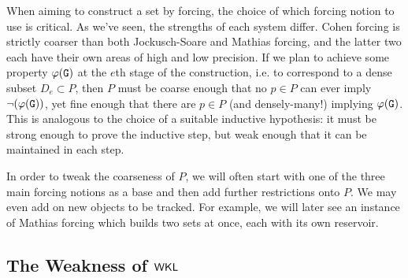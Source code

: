 \documentclass{amsart}
\begin{document}
	
	When aiming to construct a set by forcing, the choice of which forcing notion to use is critical. As we've seen, the strengths of each system differ. Cohen forcing is strictly coarser than both Jockusch-Soare and Mathias forcing, and the latter two each have their own areas of high and low precision. If we plan to achieve some property $\varphi(\mathtt{G})$ at the $e$th stage of the construction, i.e. to correspond to a dense subset $D_e\subset P$, then $P$ must be coarse enough that no $p\in P$ can ever imply $\neg(\varphi(\mathtt{G}))$, yet fine enough that there are $p\in P$ (and densely-many!) implying $\varphi(\mathtt{G})$. This is analogous to the choice of a suitable inductive hypothesis: it must be strong enough to prove the inductive step, but weak enough that it can be maintained in each step.
	
	In order to tweak the coarseness of $P$, we will often start with one of the three main forcing notions as a base and then add further restrictions onto $P$. We may even add on new objects to be tracked. For example, we will later see an instance of Mathias forcing which builds two sets at once, each with its own reservoir.
	
	
	\subsection{The Weakness of \texorpdfstring{$\sf{WKL}$}{WKL}}
	
	
\end{document}
